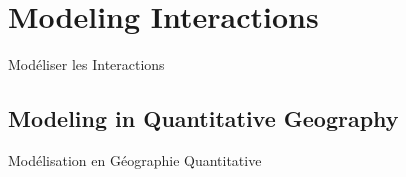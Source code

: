 




\newpage

\section{Modeling Interactions}{Modéliser les Interactions}


\subsection{Modeling in Quantitative Geography}{Modélisation en Géographie Quantitative}



